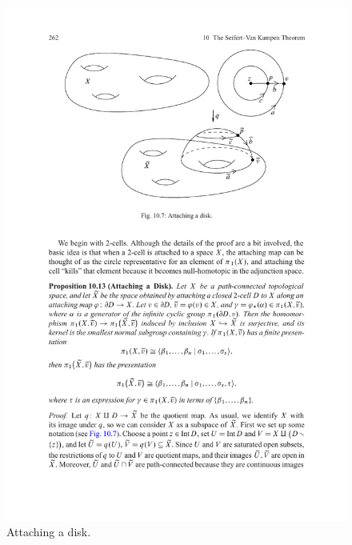 \begin{figure}[htbp]
\centering
\includegraphics{attaching-disk}
\caption{Attaching a disk.}
\end{figure}
